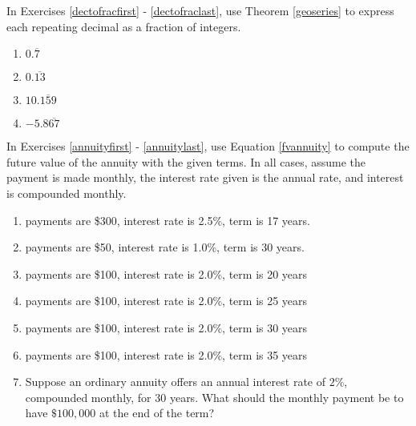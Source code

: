 \pagebreak

In Exercises \ref{dectofracfirst} - \ref{dectofraclast}, use Theorem \ref{geoseries} to express each repeating decimal as a fraction of integers.

\begin{multicols}{4}

\begin{enumerate}
\setcounter{enumi}{\value{HW}}
\item $0.\overline{7}$ \label{dectofracfirst}
\item $0.\overline{13}$
\item $10.\overline{159}$
\item $-5.8\overline{67}$ \label{dectofraclast}
\setcounter{HW}{\value{enumi}}
\end{enumerate}

\end{multicols}


In Exercises \ref{annuityfirst} - \ref{annuitylast}, use Equation \ref{fvannuity} to compute the future value of the annuity with the given terms.  In all cases, assume the payment is made monthly, the interest rate given is the annual rate, and interest is compounded monthly.

\begin{enumerate}
\setcounter{enumi}{\value{HW}}

\item payments are \$300, interest rate is 2.5\%, term is 17 years. \label{annuityfirst}

\item payments are \$50, interest rate is 1.0\%,  term is 30 years. 

\item payments are \$100, interest rate is 2.0\%, term is 20 years 

\item  payments are \$100, interest rate is 2.0\%,  term is  25 years

\item  payments are \$100, interest rate is 2.0\%,  term is  30 years


\item  payments are \$100, interest rate is 2.0\%,  term is  35 years
\label{annuitylast}   
 
\item Suppose an ordinary annuity offers an annual interest rate of $2 \%$, compounded monthly, for 30 years. What should the monthly payment be to have $\$100,\!000$ at the end of the term? 

\setcounter{HW}{\value{enumi}}
\end{enumerate}


